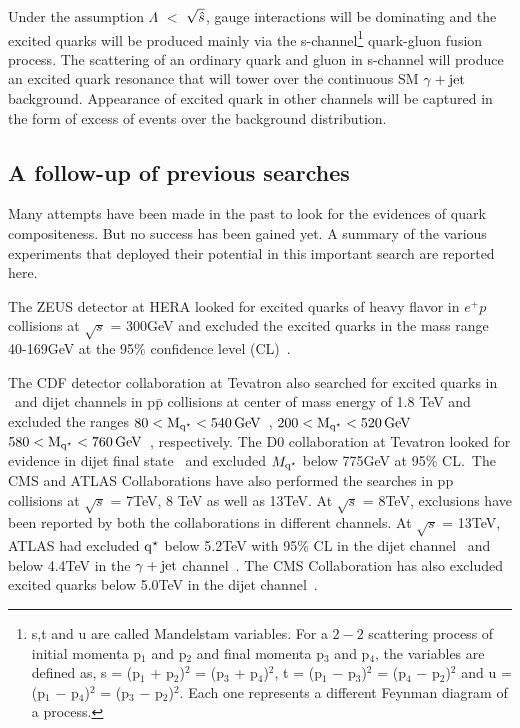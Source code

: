 Under the assumption $\Lambda$ $<$ $\sqrt{\hat{s}}$, gauge interactions will be dominating and the excited quarks will be produced mainly via the
s-channel\footnote{s,t and u are called Mandelstam variables. For a $2-2$ scattering process
  of initial momenta p$_{1}$ and p$_{2}$ and final momenta p$_{3}$ and p$_{4}$, the variables are defined as, s = (p$_{1}$ + p$_{2}$)$^{2}$ = (p$_{3}$ + p$_{4}$)$^{2}$,
  t = (p$_{1}$ $-$ p$_{3}$)$^{2}$ = (p$_{4}$ $-$ p$_{2}$)$^{2}$ and u = (p$_{1}$ $-$ p$_{4}$)$^{2}$ = (p$_{3}$ $-$ p$_{2}$)$^{2}$. Each one represents a different
  Feynman diagram of a process.}
quark-gluon fusion process. The scattering of an ordinary quark and gluon in s-channel
will produce an excited quark resonance that will tower over the continuous SM $\gamma+\mathrm{jet}$ background. Appearance of excited quark in other channels will be
captured in the form of excess of events over the background distribution. 

\subsection{A follow-up of previous searches}
Many attempts have been made in the past to look for the evidences of quark compositeness. But no success has been gained yet.
A summary of the various experiments that deployed their potential in this important search are reported here. 

The ZEUS detector at HERA looked for excited quarks of heavy flavor in $e^{+}p$ collisions at $\sqrt{s}$ = 300\unit{GeV} and excluded the excited quarks
in the mass range 40-169\unit{GeV} at the 95$\%$ confidence level (CL)~\cite{Breitweg:1997qa}. 

The CDF detector collaboration at Tevatron also searched for excited quarks in \gamjet\ and
dijet channels in $\textrm{p}\bar{\textrm{p}}$ collisions at center of mass
energy of 1.8 TeV and excluded the ranges $80<\mathrm{M_{q^\star}}<540\mathrm{\,GeV}$~\cite{CDFexclgj}, $200<\mathrm{M_{q^\star}}<520\mathrm{\,GeV}$ \nd\
$580<\mathrm{M_{q^\star}}<760\mathrm{\,GeV}$~\cite{CDFexcljj}, respectively. The D0 collaboration at Tevatron looked for evidence in dijet final state~\cite{D0excl}
and excluded $M_{\mathrm{q^\star}}$ below 775\unit{GeV} at 95\% CL.\ The CMS and ATLAS Collaborations have also performed the searches in $\textrm{pp}$ collisions
at $\sqrt{s}$ = 7\unit{TeV}, 8 \unit{TeV} as well as 13\unit{TeV}. At $\sqrt{s}$ = 8\unit{TeV}, exclusions have been reported by both the collaborations
in different channels. At $\sqrt{s}$ = 13\unit{TeV}, ATLAS had excluded $\mathrm{q^\star}$ below 5.2\unit{TeV}
with 95$\%$ CL in the dijet channel~\cite{ATLAS:2015nsi} and below 4.4\unit{TeV} in the $\gamma+\mathrm{jet}$ channel~\cite{Aad:2015ywd}. The CMS Collaboration
has also excluded excited quarks below 5.0\unit{TeV} in the dijet channel~\cite{Khachatryan:2015dcf}.

